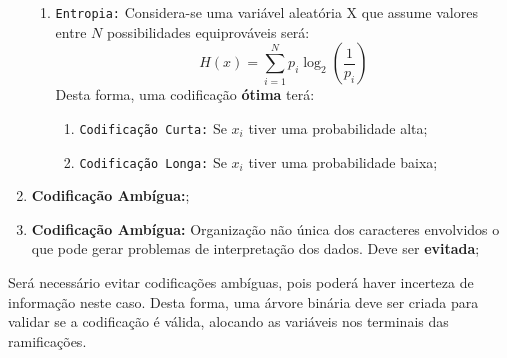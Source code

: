 \documentclass{article}
\begin{document}
\begin{enumerate}[rightmargin = \leftmargin]
\begin{enumerate}[noitemsep, rightmargin = \leftmargin]
                            \item \texttt{Entropia:} Considera-se uma variável aleatória X que assume valores entre $N$ possibilidades equiprováveis será:
                                \begin{equation}
                                    \boxed{
                                        H(x) = \sum_{i=1}^{N}p_{i}\log_{2}\left(\frac{1}{p_{i}}\right)
                                    }
                                \end{equation}
                            Desta forma, uma codificação \textbf{ótima} terá:
                                \begin{enumerate}[noitemsep, rightmargin = \leftmargin]
                                    \item \texttt{Codificação Curta:} Se $x_{i}$ tiver uma probabilidade alta;
                                    \item \texttt{Codificação Longa:} Se $x_{i}$ tiver uma probabilidade baixa;
                                \end{enumerate}
                        \end{enumerate}

                    \item \textbf{Codificação Ambígua:};
                    \item \textbf{Codificação Ambígua:} Organização não única dos caracteres envolvidos o que pode gerar problemas de interpretação dos dados. Deve ser \textbf{evitada};
                \end{enumerate}
            Será necessário evitar codificações ambíguas, pois poderá haver incerteza de informação neste caso. Desta forma, uma árvore binária deve ser criada para validar se a codificação é válida, alocando as variáveis nos terminais das ramificações.
\end{document}
